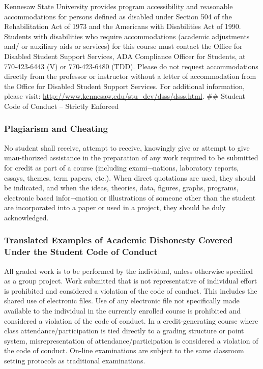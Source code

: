 \documentclass[11pt,]{article}
\begin{document}
Kennesaw State University provides program accessibility and reasonable accommodations for persons
defined as disabled under Section 504 of the Rehabilitation Act of 1973 and the Americans with
Disabilities Act of 1990. Students with disabilities who require accommodations (academic adjustments and/
or auxiliary aids or services) for this course must contact the Office for Disabled Student Support Services,
ADA Compliance Officer for Students, at 770-423-6443 (V) or 770-423-6480 (TDD). Please do not request
accommodations directly from the professor or instructor without a letter of accommodation from the
Office for Disabled Student Support Services. For additional information, please visit: \url{http://www.kennesaw.edu/stu_dev/dsss/dsss.html}.
\#\# Student Code of Conduct -- Strictly Enforced

\hypertarget{plagiarism-and-cheating}{%
\subsubsection{Plagiarism and Cheating}\label{plagiarism-and-cheating}}

No student shall receive, attempt to receive, knowingly give or attempt to give unau-thorized assistance in
the preparation of any work required to be submitted for credit as part of a course (including exami¬nations,
laboratory reports, essays, themes, term papers, etc.). When direct quotations are used, they should be
indicated, and when the ideas, theories, data, figures, graphs, programs, electronic based infor¬mation or
illustrations of someone other than the student are incorporated into a paper or used in a project, they should
be duly acknowledged.

\hypertarget{translated-examples-of-academic-dishonesty-covered-under-the-student-code-of-conduct}{%
\subsubsection{Translated Examples of Academic Dishonesty Covered Under the Student Code of Conduct}\label{translated-examples-of-academic-dishonesty-covered-under-the-student-code-of-conduct}}

All graded work is to be performed by the individual, unless otherwise specified as a group project. Work
submitted that is not representative of individual effort is prohibited and considered a violation of the code of
conduct. This includes the shared use of electronic files. Use of any electronic file not specifically made
available to the individual in the currently enrolled course is prohibited and considered a violation of the
code of conduct. In a credit-generating course where class attendance/participation is tied directly to a
grading structure or point system, misrepresentation of attendance/participation is considered a
violation of the code of conduct. On-line examinations are subject to the same classroom setting
protocols as traditional examinations.
\end{document}
